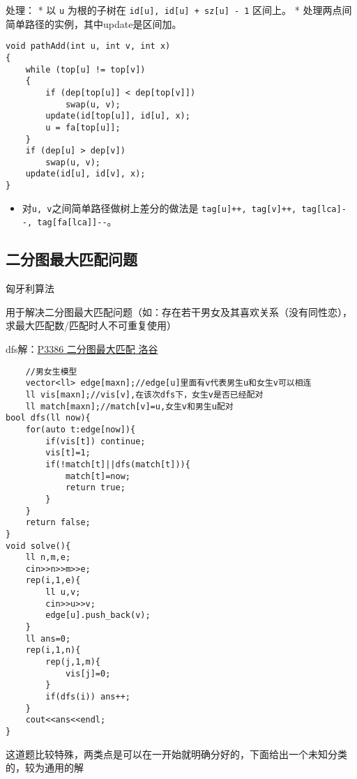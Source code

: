 \documentclass[]{article}
\providecommand{\tightlist}{%
  \setlength{\itemsep}{0pt}\setlength{\parskip}{0pt}}
\begin{document}
处理： * 以 \texttt{u} 为根的子树在
\texttt{id{[}u{]},\ id{[}u{]}\ +\ sz{[}u{]}\ -\ 1} 区间上。 *
处理两点间简单路径的实例，其中update是区间加。

\begin{verbatim}
void pathAdd(int u, int v, int x)
{
    while (top[u] != top[v])
    {
        if (dep[top[u]] < dep[top[v]])
            swap(u, v);
        update(id[top[u]], id[u], x);
        u = fa[top[u]];
    }
    if (dep[u] > dep[v])
        swap(u, v);
    update(id[u], id[v], x);
}
\end{verbatim}

\begin{itemize}
\tightlist
\item
  对\texttt{u,\ v}之间简单路径做树上差分的做法是
  \texttt{tag{[}u{]}++,\ tag{[}v{]}++,\ tag{[}lca{]}-\/-,\ tag{[}fa{[}lca{]}{]}-\/-}。
\end{itemize}

\hypertarget{ux4e8cux5206ux56feux6700ux5927ux5339ux914dux95eeux9898}{%
\subsection{二分图最大匹配问题}\label{ux4e8cux5206ux56feux6700ux5927ux5339ux914dux95eeux9898}}

匈牙利算法

用于解决二分图最大匹配问题（如：存在若干男女及其喜欢关系（没有同性恋），求最大匹配数/匹配时人不可重复使用）

dfs解：\href{https://www.luogu.com.cn/problem/P3386}{P3386
二分图最大匹配 洛谷}

\begin{verbatim}
    //男女生模型
    vector<ll> edge[maxn];//edge[u]里面有v代表男生u和女生v可以相连
    ll vis[maxn];//vis[v],在该次dfs下，女生v是否已经配对
    ll match[maxn];//match[v]=u,女生v和男生u配对
bool dfs(ll now){
    for(auto t:edge[now]){
        if(vis[t]) continue;
        vis[t]=1;
        if(!match[t]||dfs(match[t])){
            match[t]=now;
            return true;
        }
    }
    return false;
}
void solve(){
    ll n,m,e;
    cin>>n>>m>>e;
    rep(i,1,e){
        ll u,v;
        cin>>u>>v;
        edge[u].push_back(v);
    }
    ll ans=0;
    rep(i,1,n){
        rep(j,1,m){
            vis[j]=0;
        }
        if(dfs(i)) ans++;
    }
    cout<<ans<<endl;
}
\end{verbatim}

这道题比较特殊，两类点是可以在一开始就明确分好的，下面给出一个未知分类的，较为通用的解
\end{document}
